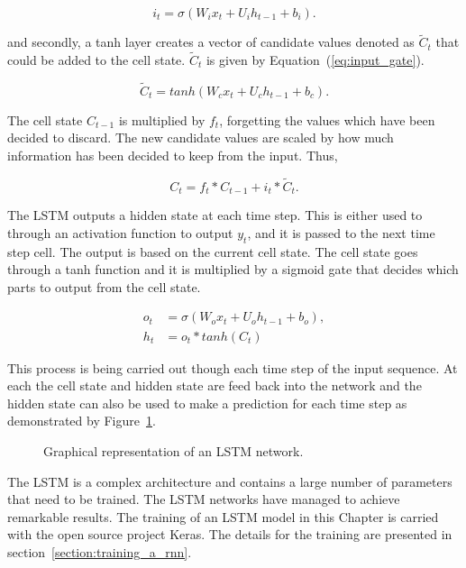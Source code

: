 \begin{equation}\label{eq:input_gate}
    i_{t} = \sigma(W_{i}x_{t} + U_{i}h_{t-1} + b_{i}).
\end{equation}

and secondly, a tanh layer creates a vector of candidate values denoted as
\(\tilde{C}_{t}\) that could be added to the cell state. \(\tilde{C}_{t}\) 
is given by Equation~(\ref{eq:input_gate}).

\begin{equation}\label{eq:input_gate}
    \tilde{C}_{t} = tanh(W_{c}x_{t} + U_{c}h_{t-1} + b_{c}).
\end{equation}

The cell state \(C_{t-1}\) is multiplied by \(f_{t}\), forgetting the values
which have been decided to discard. The new candidate values are scaled by how
much information has been decided to keep from the input. Thus,

\begin{equation}\label{eq:input_gate}
    C_{t} = f_{t} * C_{t-1} + i_{t} * \tilde{C}_{t}.
\end{equation}

The LSTM outputs a hidden state at each time step. This is either used to
through an activation function to output \(y_{t}\), and it is passed to the next
time step cell. The output is based on the current cell state. The cell state
goes through a tanh function and it is multiplied by a sigmoid gate that decides
which parts to output from the cell state.

\begin{align}\label{eq:input_gate}
    o_{t} & = \sigma(W_{o}x_{t} + U_{o}h_{t-1} + b_{o}), \\
    h_{t} & = o_{t} * tanh(C_{t})
\end{align}

This process is being carried out though each time step of the input sequence.
At each the cell state and hidden state are feed back into the network and the
hidden state can also be used to make a prediction for each time step as
demonstrated by Figure~\ref{fig:lstm}.

\begin{figure}[!htbp]
    \centering
    
    \caption{Graphical representation of an LSTM network.}\label{fig:lstm}
\end{figure}

The LSTM is a complex architecture and contains a large number of parameters
that need to be trained. The LSTM networks have managed to achieve remarkable
results. The training of an LSTM model in this Chapter is carried with the open
source project Keras. The details for the training are presented in
section~\ref{section:training_a_rnn}.


